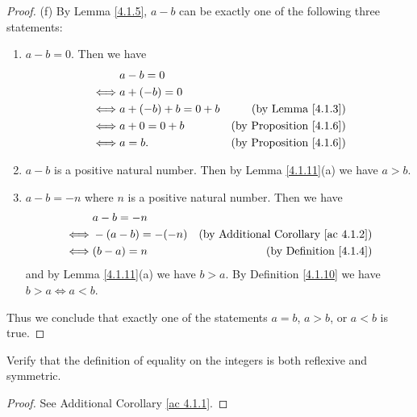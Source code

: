 \begin{proof}{(f)}
    By Lemma \ref{4.1.5}, \(a - b\) can be exactly one of the following three statements:
    \begin{enumerate}[label=(\Roman*)]
        \item \(a - b = 0\).
              Then we have
              \begin{align*}
                       & a - b = 0                                                  \\
                  \iff & a + (-b) = 0                                               \\
                  \iff & a + (-b) + b = 0 + b & \text{(by Lemma \ref{4.1.3})}       \\
                  \iff & a + 0 = 0 + b        & \text{(by Proposition \ref{4.1.6})} \\
                  \iff & a = b.               & \text{(by Proposition \ref{4.1.6})}
              \end{align*}
        \item \(a - b\) is a positive natural number.
              Then by Lemma \ref{4.1.11}(a) we have \(a > b\).
        \item \(a - b = -n\) where \(n\) is a positive natural number.
              Then we have
              \begin{align*}
                       & a - b = -n                                                         \\
                  \iff & -(a - b) = -(-n) & \text{(by Additional Corollary \ref{ac 4.1.2})} \\
                  \iff & (b - a) = n      & \text{(by Definition \ref{4.1.4})}
              \end{align*}
              and by Lemma \ref{4.1.11}(a) we have \(b > a\).
              By Definition \ref{4.1.10} we have \(b > a \iff a < b\).
    \end{enumerate}
    Thus we conclude that exactly one of the statements \(a = b\), \(a > b\), or \(a < b\) is true.
\end{proof}

\exercisesection

\begin{exercise}\label{ex 4.1.1}
    Verify that the definition of equality on the integers is both reflexive and symmetric.
\end{exercise}

\begin{proof}
    See Additional Corollary \ref{ac 4.1.1}.
\end{proof}

